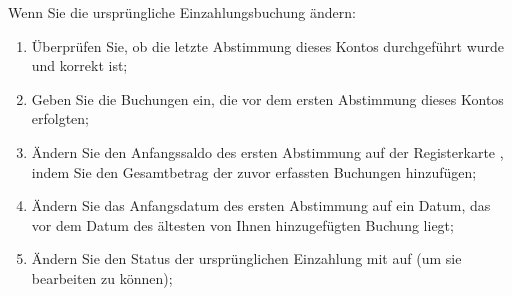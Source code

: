 Wenn Sie die ursprüngliche Einzahlungsbuchung ändern:
\begin{enumerate}
	\item Überprüfen Sie, ob die letzte Abstimmung dieses Kontos durchgeführt wurde und korrekt ist;
	\item Geben Sie die Buchungen ein, die vor dem ersten Abstimmung dieses Kontos erfolgten;
	\item Ändern Sie den Anfangssaldo des ersten Abstimmung auf der Registerkarte , indem Sie den Gesamtbetrag der zuvor erfassten Buchungen hinzufügen;
	\item Ändern Sie das Anfangsdatum des ersten Abstimmung auf ein Datum, das vor dem Datum des ältesten von Ihnen hinzugefügten Buchung liegt;
	\item Ändern Sie den Status der ursprünglichen Einzahlung mit  auf  (um sie bearbeiten zu können);

\end{enumerate}

